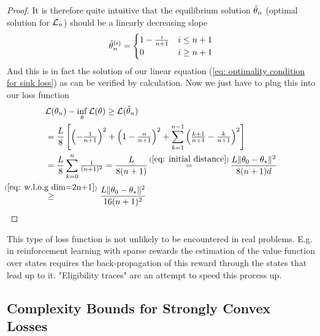 \begin{proof}
	It is therefore quite intuitive that the equilibrium solution
	\(\hat{\theta}_n\) (optimal solution for \(\mathcal{L}_n\)) should be a linearly
	decreasing slope
	\begin{align*}
		\hat{\theta}_n^{(i)} = \begin{cases}
			1 - \tfrac{i}{n+1} & i \le n+1\\
			0	& i \ge n+1
		\end{cases}
	\end{align*}	
	And this is in fact the solution of our linear equation (\ref{eq: optimality
	condition for sink loss}) as can be verified by calculation. Now we just
	have to plug this into our loss function
	\begin{align*}
		&\loss(\weights_n)-\inf_\weights\loss(\weights)
		\ge \loss(\hat{\weights}_n)\\
		&= \frac{\ubound}{8}\left[
			\left(-\tfrac1{n+1}\right)^2 + \left(1-\tfrac{n}{n+1}\right)^2
			+ \sum_{k=1}^{n-1}\left(\tfrac{k+1}{n+1}-\tfrac{k}{n+1}\right)^2
		\right]\\
		&= \frac{\ubound}{8}\sum_{k=0}^n \tfrac{1}{(n+1)^2}
		=\frac{\ubound}{8(n+1)}
		\xeq{(\ref{eq: initial distance})} \frac{L\|\weights_0 - \minimum\|^2}{8(n+1)d}\\
		&\lxge{(\ref{eq: w.l.o.g dim=2n+1})}
		\frac{L\|\weights_0 - \minimum\|^2}{16(n+1)^2}
		\qedhere
	\end{align*}
\end{proof}
\begin{remark}
	This type of loss function is not unlikely to be encountered in real
	problems. E.g. in reinforcement learning with sparse rewards the estimation
	of the value function over states requires the back-propagation of this
	reward through the states that lead up to it. "Eligibility traces"
	\parencite[Chapter 12]{suttonReinforcementLearningIntroduction2018}
	are an attempt to speed this process up.
\end{remark}

\subsection{Complexity Bounds for Strongly Convex Losses}

